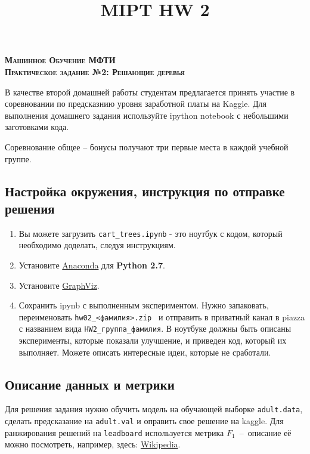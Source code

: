 \documentclass[a4paper, 12pt]{article}
\title{MIPT HW 2}
\begin{document}
  \begin{center}
    \textsc{\textbf{
    	{\Large Машинное Обучение МФТИ \\
        \vspace{0.5cm}
    	Практическое задание №2: Решающие деревья}}}
  \end{center}

\begin{center}
\end{center}

В качестве второй домашней работы студентам предлагается принять участие в соревновании по предсказнию уровня заработной платы на Kaggle. Для выполнения домашнего задания используйте ipython notebook с небольшими заготовками кода.

Соревнование общее -- бонусы получают три первые места в каждой учебной группе.

\subsection*{Настройка окружения, инструкция по отправке решения}
  \begin{enumerate}
	\item Вы можете загрузить \texttt{cart\_trees.ipynb} - это ноутбук с кодом, который необходимо доделать, следуя инструкциям.
    \item Установите \href{https://www.continuum.io/downloads}{Anaconda} для \textbf{Python 2.7}. 
    \item Установите \href{http://www.graphviz.org/}{GraphViz}.
     \item Сохранить ipynb с выполненным экспериментом. Нужно запаковать, переименовать \texttt{hw02\_<фамилия>.zip } и отправить в приватный канал в piazza с названием вида \texttt{HW2\_группа\_фамилия}. В ноутбуке должны быть описаны эксперименты, которые показали улучшение, и приведен код, который их выполняет. Можете описать интересные идеи, которые не сработали. 
  \end{enumerate}

\subsection*{Описание данных и метрики}
Для решения задания нужно обучить модель на обучающей выборке \texttt{adult.data}, сделать предсказание на \texttt{adult.val} и оправить свое решение на kaggle. Для ранжирования решений на \texttt{leadboard} используется метрика $F_1$~--~описание её можно посмотреть, например, здесь: \href{https://en.wikipedia.org/wiki/F1_score}{Wikipedia}. 
\end{document}
